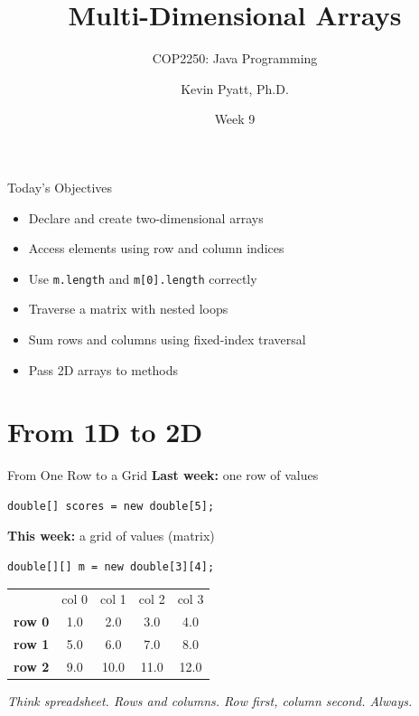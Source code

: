 \documentclass{beamer}
\title[Multi-Dim Arrays]{Multi-Dimensional Arrays}
\subtitle{COP2250: Java Programming}
\author{Kevin Pyatt, Ph.D.}
\institute{State College of Florida \\ Pyatt Labs}
\date{Week 9}
\begin{document}
\begin{frame}
  \titlepage
\end{frame}
\begin{frame}{Today's Objectives}
\begin{itemize}
  \item Declare and create two-dimensional arrays
  \item Access elements using row and column indices
  \item Use \texttt{m.length} and \texttt{m[0].length} correctly
  \item Traverse a matrix with nested loops
  \item Sum rows and columns using fixed-index traversal
  \item Pass 2D arrays to methods
\end{itemize}
\end{frame}
\section{From 1D to 2D}
\begin{frame}[fragile]{From One Row to a Grid}
\textbf{Last week:} one row of values
\begin{lstlisting}
double[] scores = new double[5];
\end{lstlisting}
\vspace{0.3cm}
\textbf{This week:} a grid of values (matrix)
\begin{lstlisting}
double[][] m = new double[3][4];
\end{lstlisting}
\vspace{0.3cm}
\begin{tabular}{ccccc}
 & col 0 & col 1 & col 2 & col 3 \\
\textbf{row 0} & 1.0 & 2.0 & 3.0 & 4.0 \\
\textbf{row 1} & 5.0 & 6.0 & 7.0 & 8.0 \\
\textbf{row 2} & 9.0 & 10.0 & 11.0 & 12.0 \\
\end{tabular}
\vspace{0.3cm}
\textit{Think spreadsheet. Rows and columns. Row first, column second. Always.}
\end{frame}
\end{document}
